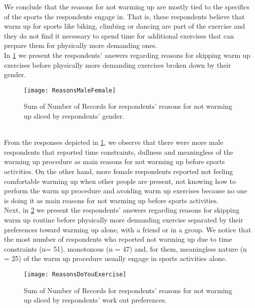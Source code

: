 We conclude that the reasons for not warming up are mostly tied to the specifics of the sports the respondents engage in. That is, these respondents believe that warm up for sports like biking, climbing or dancing are part of the exercise and they do not find it necessary to spend time for additional exercises that can prepare them for physically more demanding ones.\\In \ref{fig:ReasonsMaleFemale} we present the respondents' answers regarding reasons for skipping warm up exercises before physically more demanding exercises broken down by their gender.
\begin{figure}[h]
    \centering
    \texttt{[image: ReasonsMaleFemale]}
    \caption{Sum of Number of Records for respondents' reasons for not warming up sliced by respondents' gender.}
    \label{fig:ReasonsMaleFemale}
\end{figure}\\
From the responses depicted in \ref{fig:ReasonsMaleFemale}, we observe that there were more male respondents that reported time constraints, dullness and meaningless of the warming up procedure as main reasons for not warming up before sports activities. On the other hand, more female respondents reported not feeling comfortable warming up when other people are present, not knowing how to perform the warm up procedure and avoiding warm up exercises because no one is doing it as main reasons for not warming up before sports activities. \\Next, in \ref{fig:ReasonsDoYouExercise} we present the respondents' answers regarding reasons for skipping warm up routine before physically more demanding exercise separated by their preferences toward warming up alone, with a friend or in a group. We notice that the most number of respondents who reported not warming up due to time constraints (n= 51), monotonous (n = 47) and, for them, meaningless nature (n = 25) of the warm up procedure usually engage in sports activities alone. 
\begin{figure}[h]
    \centering
    \texttt{[image: ReasonsDoYouExercise]}
    \caption{Sum of Number of Records for respondents' reasons for not warming up sliced by respondents' work out preferences.}
    \label{fig:ReasonsDoYouExercise}
\end{figure}
